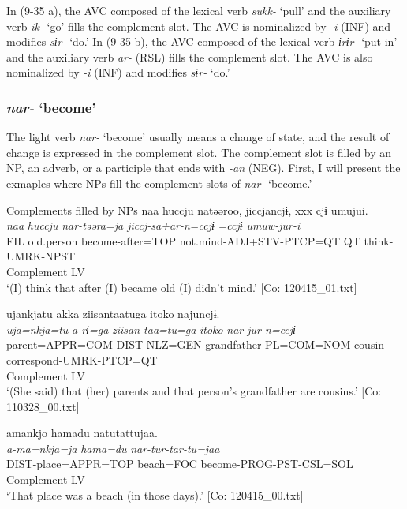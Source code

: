 In (9-35 a), the AVC composed of the lexical verb \textit{sukk-} ‘pull’ and the auxiliary verb \textit{ik-} ‘go’ fills the complement slot. The AVC is nominalized by \textit{{}-i} (INF) and modifies \textit{sɨr-} ‘do.’ In (9-35 b), the AVC composed of the lexical verb \textit{ɨrɨr-} ‘put in’ and the auxiliary verb \textit{ar-} (RSL) fills the complement slot. The AVC is also nominalized by \textit{{}-i} (INF) and modifies \textit{sɨr-} ‘do.’

\subsubsection{\textit{nar-} ‘become’}\label{sec:9.1.2.2}

The light verb \textit{nar-} ‘become’ usually means a change of state, and the result of change is expressed in the complement slot. The complement slot is filled by an NP, an adverb, or a participle that ends with \textit{{}-an} (NEG). First, I will present the exmaples where NPs fill the complement slots of \textit{nar-} ‘become.’

\ea   Complements filled by NPs \label{ex:9.36}
\ea %
 \gllll  naa  huccju  natəəroo,  jiccjancjɨ,                                       xxx  cjɨ  umujui.  \\
      \textit{naa}  \textit{huccju}  \textit{nar{}-təəra=ja  jiccj-sa+ar-n=ccjɨ}             \textit{=ccjɨ}  \textit{umuw-jur-i}  \\
      FIL  old.person  become-after=TOP  not.mind-ADJ+STV-PTCP=QT                            QT  think-UMRK-NPST  \\
        Complement  LV  \\
      \glt       ‘(I) think that after (I) became old (I) didn’t mind.’ [Co: 120415\_01.txt]

\ex \label{ex:9.36b} %
    \gllll  ujankjatu  akka  ziisantaatuga    {\textbar}itoko{\textbar}  najuncjɨ.\\
      \textit{uja=nkja=tu}  \textit{a-rɨ=ga}  \textit{ziisan-taa=tu=ga}   \textit{itoko}  \textit{nar{}-jur-n=ccjɨ}\\
      parent=APPR=COM  DIST-NLZ=GEN  grandfather-PL=COM=NOM  cousin  correspond-UMRK-PTCP=QT\\
                                                             Complement  LV\\
      \glt       ‘(She said) that (her) parents and that person’s grandfather are cousins.’ [Co: 110328\_00.txt]

\ex \label{ex:9.36c} %
    \gllll  amankjo  hamadu  natutattujaa.\\
      \textit{a-ma=nkja=ja}  \textit{hama=du}  \textit{nar{}-tur-tar-tu=jaa}\\
      DIST-place=APPR=TOP  beach=FOC  become-PROG-PST-CSL=SOL\\
        Complement  LV\\
      \glt       ‘That place was a beach (in those days).’ [Co: 120415\_00.txt]

